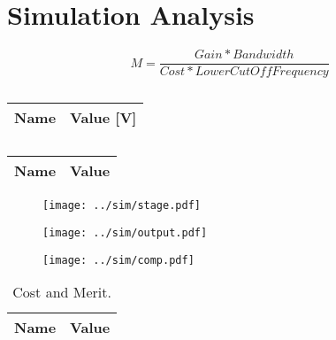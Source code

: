 \section{Simulation Analysis}
\label{sec:simulation}



\begin{equation}
\label{eqn:merit}
M=\frac{Gain*Bandwidth}{Cost*LowerCutOffFrequency}
\end{equation}



\begin{table}[h]
  \centering
  \begin{tabular}{|l|r|}
    \hline    
	  {\bf Name} & {\bf Value [V]} \\ \hline
    
  \end{tabular}
  \caption{}
  \label{tab:opsim}
\end{table}




\begin{table}[h]
  \centering
  \begin{tabular}{|l|r|}
    \hline    
    {\bf Name} & {\bf Value} \\ \hline
	
	  
  \end{tabular}
  \caption{}
  \label{tab:simdata}
\end{table}







\begin{figure}[h] \centering
\texttt{[image: ../sim/stage.pdf]}
	\caption{}
\label{fig:gstage}
\end{figure}



\begin{figure}[h] \centering
\texttt{[image: ../sim/output.pdf]}
	\caption{}
\label{fig:out}
\end{figure}





\begin{figure}[h] \centering
\texttt{[image: ../sim/comp.pdf]}
        \caption{}
\label{fig:comp}
\end{figure}




\begin{table}[h]
  \centering
  \begin{tabular}{|l|r|}
    \hline    
    {\bf Name} & {\bf Value} \\ \hline
    
  \end{tabular}
  \caption{Cost and Merit.}
  \label{tab:merit}
\end{table}



